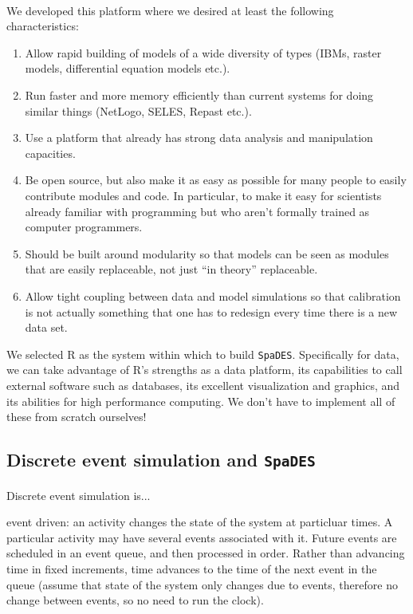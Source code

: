 \documentclass{article}
\begin{document}
\paragraph{}
We developed this platform where we desired at least the following characteristics:
\begin{enumerate}
  \item Allow rapid building of models of a wide diversity of types (IBMs, raster models, differential equation models etc.).
  \item Run faster and more memory efficiently than current systems for doing similar things (NetLogo, SELES, Repast etc.).
  \item Use a platform that already has strong data analysis and manipulation capacities.
  \item Be open source, but also make it as easy as possible for many people to easily contribute modules and code. In particular, to make it easy for scientists already familiar with programming but who aren't formally trained as computer programmers.
  \item Should be built around modularity so that models can be seen as modules that are easily replaceable, not just ``in theory'' replaceable.
  \item Allow tight coupling between data and model simulations so that calibration is not actually something that one has to redesign every time there is a new data set.
\end{enumerate}
We selected R as the system within which to build \texttt{SpaDES}. Specifically for data, we can take advantage of R's strengths as a data platform, its capabilities to call external software such as databases, its excellent visualization and graphics, and its abilities for high performance computing. We don't have to implement all of these from scratch ourselves!

\subsection{Discrete event simulation and \texttt{SpaDES}}

\paragraph{}
Discrete event simulation is...

event driven: an activity changes the state of the system at particluar times. A particular activity may have several events associated with it. Future events are scheduled in an event queue, and then processed in order. Rather than advancing time in fixed increments, time advances to the time of the next event in the queue (assume that state of the system only changes due to events, therefore no change between events, so no need to run the clock).
\end{document}
